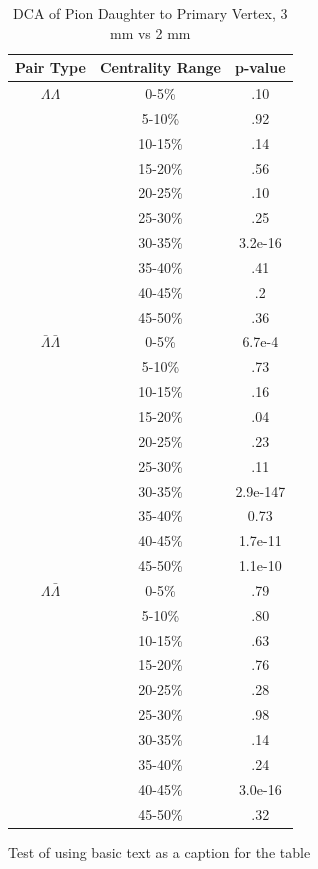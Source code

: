 \begin{table}
\caption {DCA of Pion Daughter to Primary Vertex, 3 mm vs 2 mm} \label{tab:DcaPionPvalueTests3mmVs2mm}
\begin{center}
\begin{tabular}{| c | c | c |}
  \hline                       
  Pair Type & Centrality Range & p-value \\
  \hline
  $\Lambda\Lambda$ & 0-5\% & .10 \\
   & 5-10\%  & .92 \\
   & 10-15\% & .14 \\
   & 15-20\% & .56 \\
   & 20-25\% & .10 \\
   & 25-30\% & .25 \\
   & 30-35\% & 3.2e-16 \\
   & 35-40\% & .41 \\
   & 40-45\% & .2 \\
   & 45-50\% & .36 \\
   \hline
  $\bar{\Lambda}\bar{\Lambda}$ &  0-5\% & 6.7e-4 \\
   & 5-10\% & .73 \\
   & 10-15\% & .16 \\
   & 15-20\% & .04 \\
   & 20-25\% & .23 \\
   & 25-30\% & .11 \\
   & 30-35\% & 2.9e-147 \\
   & 35-40\% & 0.73 \\
   & 40-45\% & 1.7e-11 \\
   & 45-50\% &  1.1e-10 \\
   \hline
  $\Lambda\bar{\Lambda}$ &  0-5\% & .79 \\
   & 5-10\% & .80 \\
   & 10-15\% & .63 \\
   & 15-20\% & .76 \\
   & 20-25\% & .28 \\
   & 25-30\% & .98 \\
   & 30-35\% & .14 \\
   & 35-40\% & .24 \\
   & 40-45\% & 3.0e-16 \\
   & 45-50\% & .32 \\
  \hline  
\end{tabular}
Test of using basic text as a caption for the table
\end{center}
\end{table}



